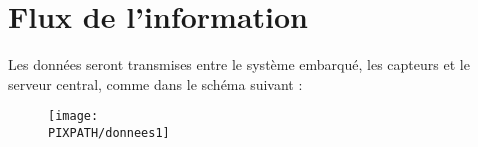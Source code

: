 \section{Flux de l'information} 

Les données seront transmises entre le système embarqué, les capteurs et le 
serveur central, comme dans le schéma suivant : \\

    \begin{figure}
    \centering
    \texttt{[image: \\PIXPATH/donnees1]}
    \end{figure}
